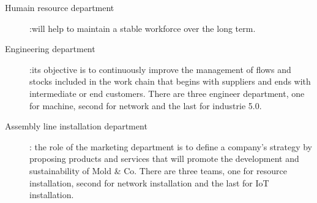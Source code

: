 \begin{description}
    \item[Humain resource department]:will help to maintain a stable workforce over the long term.
    \item[Engineering department]:its objective is to continuously improve the management of flows and stocks included in the work chain that begins with suppliers and ends with intermediate or end customers. There are three engineer department, one for machine, second for network and the last for industrie 5.0.
    \item[Assembly line installation department]: the role of the marketing department is to define a company's strategy by proposing products and services that will promote the development and sustainability of Mold \& Co. There are three teams, one for resource installation, second for network installation and the last for IoT installation.
\end{description} 
